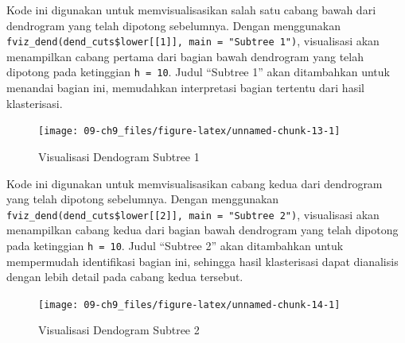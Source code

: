 \documentclass[
  oneside]{book}
\newenvironment{Shaded}{\begin{snugshade}}{\end{snugshade}}
\newcommand{\AttributeTok}[1]{\textcolor[rgb]{0.13,0.29,0.53}{#1}}
\newcommand{\CommentTok}[1]{\textcolor[rgb]{0.56,0.35,0.01}{\textit{#1}}}
\newcommand{\DecValTok}[1]{\textcolor[rgb]{0.00,0.00,0.81}{#1}}
\newcommand{\FunctionTok}[1]{\textcolor[rgb]{0.13,0.29,0.53}{\textbf{#1}}}
\newcommand{\NormalTok}[1]{#1}
\newcommand{\SpecialCharTok}[1]{\textcolor[rgb]{0.81,0.36,0.00}{\textbf{#1}}}
\newcommand{\StringTok}[1]{\textcolor[rgb]{0.31,0.60,0.02}{#1}}
\begin{document}
Kode ini digunakan untuk memvisualisasikan salah satu cabang bawah dari dendrogram yang telah dipotong sebelumnya. Dengan menggunakan \texttt{fviz\_dend(dend\_cuts\$lower{[}{[}1{]}{]},\ main\ =\ "Subtree\ 1")}, visualisasi akan menampilkan cabang pertama dari bagian bawah dendrogram yang telah dipotong pada ketinggian \texttt{h\ =\ 10}. Judul ``Subtree 1'' akan ditambahkan untuk menandai bagian ini, memudahkan interpretasi bagian tertentu dari hasil klasterisasi.

\begin{Shaded}
\end{Shaded}

\begin{figure}[h]

{\centering \texttt{[image: 09-ch9\_files/figure-latex/unnamed-chunk-13-1]} 

}

\caption{Visualisasi Dendogram Subtree 1}\label{fig:unnamed-chunk-13}
\end{figure}

Kode ini digunakan untuk memvisualisasikan cabang kedua dari dendrogram yang telah dipotong sebelumnya. Dengan menggunakan \texttt{fviz\_dend(dend\_cuts\$lower{[}{[}2{]}{]},\ main\ =\ "Subtree\ 2")}, visualisasi akan menampilkan cabang kedua dari bagian bawah dendrogram yang telah dipotong pada ketinggian \texttt{h\ =\ 10}. Judul ``Subtree 2'' akan ditambahkan untuk mempermudah identifikasi bagian ini, sehingga hasil klasterisasi dapat dianalisis dengan lebih detail pada cabang kedua tersebut.

\begin{Shaded}
\end{Shaded}

\begin{figure}[h]

{\centering \texttt{[image: 09-ch9\_files/figure-latex/unnamed-chunk-14-1]} 

}

\caption{Visualisasi Dendogram Subtree 2}\label{fig:unnamed-chunk-14}
\end{figure}
\end{document}
